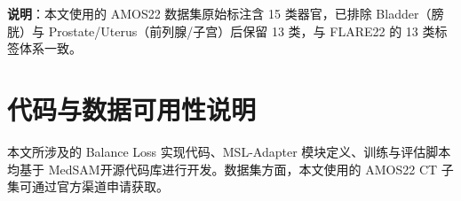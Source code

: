 \textbf{说明}：本文使用的 AMOS22 数据集原始标注含 15 类器官，已排除 Bladder（膀胱）与 Prostate/Uterus（前列腺/子宫）后保留 13 类，与 FLARE22 的 13 类标签体系一致。

\section{代码与数据可用性说明}

本文所涉及的 Balance Loss 实现代码、MSL-Adapter 模块定义、训练与评估脚本均基于 MedSAM\cite{ma2024medsam}开源代码库进行开发。数据集方面，本文使用的 AMOS22 CT 子集可通过官方渠道申请获取。
